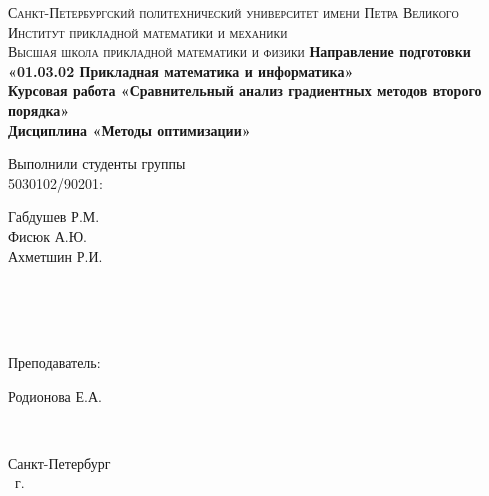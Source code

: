 \documentclass[14pt,a4paper,article,oneside]{ncc}
\begin{document}
    \begin{titlepage}
        \thispagestyle{empty}
        \begin{center}
            \textsc{
                Санкт-Петербургский политехнический университет имени Петра Великого \\[5mm]
                Институт прикладной математики и механики\\[2mm]
                Высшая школа прикладной математики и физики
            }
            \vfill
            \textbf{\large
            Направление подготовки\\
            «01.03.02 Прикладная математика и информатика»\\[3mm]
            }
            \vfill
            \textbf{\large
            Курсовая работа «Сравнительный анализ градиентных методов второго порядка»\\[5mm]
            Дисциплина «Методы оптимизации»\\
            }
        \end{center}

        \vfill

        \begin{minipage}{0.5\textwidth}
            \begin{flushleft}
                Выполнили студенты группы\\5030102/90201:
            \end{flushleft}
        \end{minipage}
        \begin{minipage}{0.5\textwidth}
            \begin{flushright}
                Габдушев Р.М.\\
                Фисюк А.Ю.\\
                Ахметшин Р.И.
            \end{flushright}
        \end{minipage}\\\\\\
        \begin{minipage}{0.5\textwidth}
            \begin{flushleft}
                Преподаватель:
            \end{flushleft}
        \end{minipage}
        \begin{minipage}{0.5\textwidth}
            \begin{flushright}
                Родионова Е.А.
            \end{flushright}
        \end{minipage}\\

        \vfill

        \begin{center}
            Санкт-Петербург\\
            \theyear\ г.
        \end{center}

    \end{titlepage}
\end{document}
